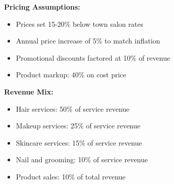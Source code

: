 \textbf{Pricing Assumptions:}
\begin{itemize}[leftmargin=2em]
    \item Prices set 15-20\% below town salon rates
    \item Annual price increase of 5\% to match inflation
    \item Promotional discounts factored at 10\% of revenue
    \item Product markup: 40\% on cost price
\end{itemize}

\textbf{Revenue Mix:}
\begin{itemize}[leftmargin=2em]
    \item Hair services: 50\% of service revenue
    \item Makeup services: 25\% of service revenue
    \item Skincare services: 15\% of service revenue
    \item Nail and grooming: 10\% of service revenue
    \item Product sales: 10\% of total revenue
\end{itemize}

\vspace{1em}

